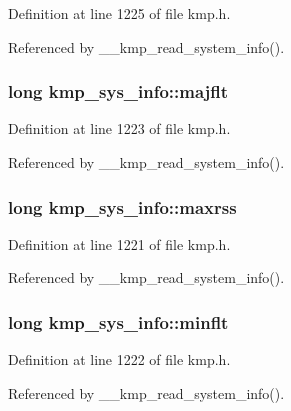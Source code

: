 Definition at line 1225 of file kmp.\-h.



Referenced by \-\_\-\-\_\-kmp\-\_\-read\-\_\-system\-\_\-info().

\hypertarget{structkmp__sys__info_a2831ec7e3cd6546b2e04cfc9afe2c2cf}{
\subsubsection[{majflt}]{\setlength{\rightskip}{0pt plus 5cm}long kmp\-\_\-sys\-\_\-info\-::majflt}}\label{structkmp__sys__info_a2831ec7e3cd6546b2e04cfc9afe2c2cf}


Definition at line 1223 of file kmp.\-h.



Referenced by \-\_\-\-\_\-kmp\-\_\-read\-\_\-system\-\_\-info().

\hypertarget{structkmp__sys__info_af2816624ab3d81d5955b91761aa533fa}{
\subsubsection[{maxrss}]{\setlength{\rightskip}{0pt plus 5cm}long kmp\-\_\-sys\-\_\-info\-::maxrss}}\label{structkmp__sys__info_af2816624ab3d81d5955b91761aa533fa}


Definition at line 1221 of file kmp.\-h.



Referenced by \-\_\-\-\_\-kmp\-\_\-read\-\_\-system\-\_\-info().

\hypertarget{structkmp__sys__info_a02a36302bc462405fae7b4d7309a7370}{
\subsubsection[{minflt}]{\setlength{\rightskip}{0pt plus 5cm}long kmp\-\_\-sys\-\_\-info\-::minflt}}\label{structkmp__sys__info_a02a36302bc462405fae7b4d7309a7370}


Definition at line 1222 of file kmp.\-h.



Referenced by \-\_\-\-\_\-kmp\-\_\-read\-\_\-system\-\_\-info().

